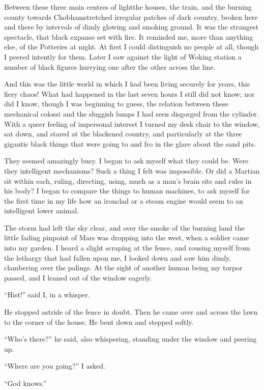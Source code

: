 Between these three main centres of light\dash{}the houses, the train,
and the burning county towards Chobham\dash{}stretched irregular patches
of dark country, broken here and there by intervals of dimly
glowing and smoking ground. It was the strangest spectacle, that
black expanse set with fire. It reminded me, more than anything
else, of the Potteries at night. At first I could distinguish no
people at all, though I peered intently for them. Later I saw
against the light of Woking station a number of black figures
hurrying one after the other across the line.

And this was the little world in which I had been living securely
for years, this fiery chaos! What had happened in the last seven
hours I still did not know; nor did I know, though I was beginning
to guess, the relation between these mechanical colossi and the
sluggish lumps I had seen disgorged from the cylinder. With a queer
feeling of impersonal interest I turned my desk chair to the
window, sat down, and stared at the blackened country, and
particularly at the three gigantic black things that were going to
and fro in the glare about the sand pits.

They seemed amazingly busy. I began to ask myself what they could
be. Were they intelligent mechanisms? Such a thing I felt was
impossible. Or did a Martian sit within each, ruling, directing,
using, much as a man's brain sits and rules in his body? I began to
compare the things to human machines, to ask myself for the first
time in my life how an ironclad or a steam engine would seem to an
intelligent lower animal.

The storm had left the sky clear, and over the smoke of the burning
land the little fading pinpoint of Mars was dropping into the west,
when a soldier came into my garden. I heard a slight scraping at
the fence, and rousing myself from the lethargy that had fallen
upon me, I looked down and saw him dimly, clambering over the
palings. At the sight of another human being my torpor passed, and
I leaned out of the window eagerly.

``Hist!'' said I, in a whisper.

He stopped astride of the fence in doubt. Then he came over and
across the lawn to the corner of the house. He bent down and
stepped softly.

``Who's there?'' he said, also whispering, standing under the window
and peering up.

``Where are you going?'' I asked.

``God knows.''

